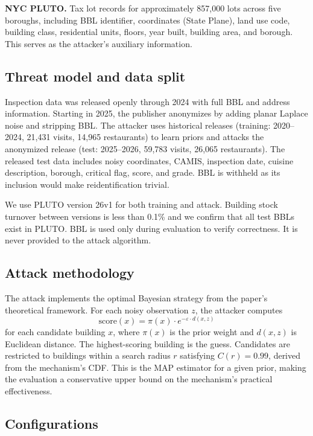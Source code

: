 \documentclass[11pt]{article}
\begin{document}
\textbf{NYC PLUTO.} Tax lot records for approximately 857,000 lots across five boroughs, including BBL identifier, coordinates (State Plane), land use code, building class, residential units, floors, year built, building area, and borough. This serves as the attacker's auxiliary information.

\subsection{Threat model and data split}

Inspection data was released openly through 2024 with full BBL and address information. Starting in 2025, the publisher anonymizes by adding planar Laplace noise and stripping BBL. The attacker uses historical releases (training: 2020--2024, 21,431 visits, 14,965 restaurants) to learn priors and attacks the anonymized release (test: 2025--2026, 59,783 visits, 26,065 restaurants). The released test data includes noisy coordinates, CAMIS, inspection date, cuisine description, borough, critical flag, score, and grade. BBL is withheld as its inclusion would make reidentification trivial.

We use PLUTO version 26v1 for both training and attack. Building stock turnover between versions is less than 0.1\% and we confirm that all test BBLs exist in PLUTO. BBL is used only during evaluation to verify correctness. It is never provided to the attack algorithm.

\subsection{Attack methodology}

The attack implements the optimal Bayesian strategy from the paper's theoretical framework. For each noisy observation $z$, the attacker computes
\begin{equation}
\text{score}(x) = \pi(x) \cdot e^{-\varepsilon \cdot d(x, z)}
\end{equation}
for each candidate building $x$, where $\pi(x)$ is the prior weight and $d(x, z)$ is Euclidean distance. The highest-scoring building is the guess. Candidates are restricted to buildings within a search radius $r$ satisfying $C(r) = 0.99$, derived from the mechanism's CDF. This is the MAP estimator for a given prior, making the evaluation a conservative upper bound on the mechanism's practical effectiveness.

\subsection{Configurations}
\end{document}
